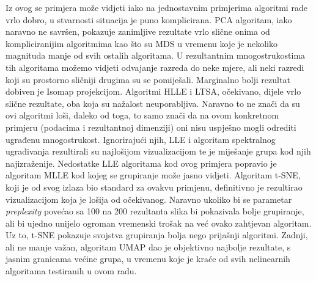 \documentclass[times, utf8, diplomski]{fer}
\begin{document}
Iz ovog se primjera može vidjeti iako na jednostavnim primjerima algoritmi rade vrlo dobro, u stvarnosti situacija je puno komplicirana. PCA algoritam, iako naravno ne savršen, pokazuje zanimljive rezultate vrlo slične onima od kompliciranijim algoritmima kao što su MDS u vremenu koje je nekoliko magnituda manje od svih ostalih algoritama. U rezultantnim mnogostrukostima tih algoritama možemo vidjeti odvajanje razreda do neke mjere, ali neki razredi koji su prostorno sličniji drugima su se pomiješali. Marginalno bolji rezultat dobiven je Isomap projekcijom. Algoritmi HLLE i LTSA, očekivano, dijele vrlo slične rezultate, oba koja su nažalost neuporabljiva. Naravno to ne znači da su ovi algoritmi loši, daleko od toga, to samo znači da na ovom konkretnom primjeru (podacima i rezultantnoj dimenziji) oni nisu uspješno mogli odrediti ugrađenu mnogostrukost. Ignorirajući njih, LLE i algoritam spektralnog ugrađivanja rezultirali su najlošijom vizualizacijom te je miješanje grupa kod njih najizraženije. Nedostatke LLE algoritama kod ovog primjera popravio je algoritam MLLE kod kojeg se grupiranje može jasno vidjeti. Algoritam t-SNE, koji je od svog izlaza bio standard za ovakvu primjenu, definitivno je rezultirao vizualizacijom koja je lošija od očekivanog. Naravno ukoliko bi se parametar \emph{preplexity} povećao sa 100 na 200 rezultanta slika bi pokazivala bolje grupiranje, ali bi ujedno unijelo ogroman vremenski trošak na već ovako zahtjevan algoritam. Uz to, t-SNE pokazuje svojstva grupiranja bolja nego prijašnji algoritmi. Zadnji, ali ne manje važan, algoritam UMAP dao je objektivno najbolje rezultate, s jasnim granicama većine grupa, u vremenu koje je kraće od svih nelinearnih algoritama testiranih u ovom radu.

\bigskip
{}
\end{document}

